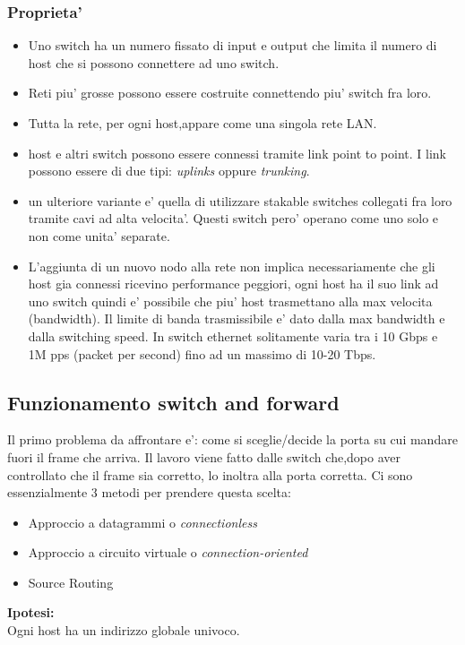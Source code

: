 \subsubsection{Proprieta'}
\begin{itemize}
  \item Uno switch ha un numero fissato di input e output che limita il numero di host che si possono connettere ad uno switch.
  \item Reti piu' grosse possono essere costruite connettendo piu' switch fra loro.
  \item Tutta la rete, per ogni host,appare come una singola rete LAN.
  \item host e altri switch possono essere connessi tramite link point to point. I link possono essere di due tipi: \textit{uplinks} oppure \textit{trunking}.
  \item un ulteriore variante e' quella di utilizzare stakable switches collegati fra loro tramite cavi ad alta velocita'. Questi switch pero' operano come uno solo e non come unita' separate.
  \item L'aggiunta di un nuovo nodo alla rete non implica necessariamente che gli host gia connessi ricevino performance peggiori, ogni host ha il suo link ad uno switch quindi e' possibile che piu' host trasmettano alla max velocita (bandwidth). Il limite di banda trasmissibile e' dato dalla max bandwidth e dalla switching speed. In switch ethernet solitamente varia tra i 10 Gbps e 1M pps (packet per second) fino ad un massimo di 10-20 Tbps.
\end{itemize}
\subsection{Funzionamento switch and forward}
Il primo problema da affrontare e': come si sceglie/decide la porta su cui mandare fuori il frame che arriva. Il lavoro viene fatto dalle switch che,dopo aver controllato che il frame sia corretto, lo inoltra alla porta corretta. Ci sono essenzialmente 3 metodi per prendere questa scelta:
\begin{itemize}
  \item Approccio a datagrammi o \textit{connectionless}
  \item Approccio a circuito virtuale o \textit{connection-oriented}
  \item Source Routing
\end{itemize}
\textbf{Ipotesi:} \\
Ogni host ha un indirizzo globale univoco.\\
